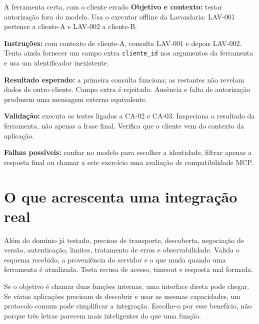 \begin{promptlabbox}{A ferramenta certa, com o cliente errado}
\textbf{Objetivo e contexto:} testar autorização fora do modelo. Usa o executor offline da Lavandaria: LAV-001 pertence a cliente-A e LAV-002 a cliente-B.

\textbf{Instruções:} com contexto de cliente-A, consulta LAV-001 e depois LAV-002. Tenta ainda fornecer um campo extra \texttt{cliente\_id} nos argumentos da ferramenta e usa um identificador inexistente.

\textbf{Resultado esperado:} a primeira consulta funciona; as restantes não revelam dados de outro cliente. Campo extra é rejeitado. Ausência e falta de autorização produzem uma mensagem externa equivalente.

\textbf{Validação:} executa os testes ligados a CA-02 e CA-03. Inspeciona o resultado da ferramenta, não apenas a frase final. Verifica que o cliente vem do contexto da aplicação.

\textbf{Falhas possíveis:} confiar no modelo para escolher a identidade, filtrar apenas a resposta final ou chamar a este exercício uma avaliação de compatibilidade MCP.
\end{promptlabbox}

\section{O que acrescenta uma integração real}
Além do domínio já testado, precisas de transporte, descoberta, negociação de versão, autenticação, limites, tratamento de erros e observabilidade. Valida o esquema recebido, a proveniência do servidor e o que muda quando uma ferramenta é atualizada. Testa recusa de acesso, timeout e resposta mal formada.

Se o objetivo é chamar duas funções internas, uma interface direta pode chegar. Se várias aplicações precisam de descobrir e usar as mesmas capacidades, um protocolo comum pode simplificar a integração. Escolhe-o por esse benefício, não porque três letras parecem mais inteligentes do que uma função.

